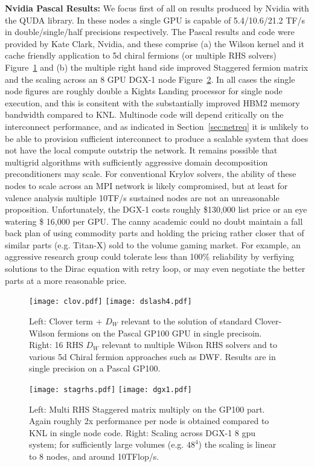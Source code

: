 \documentclass{PoS}
\begin{document}
{\bf Nvidia Pascal Results:}
We focus first of all on results produced by Nvidia with the QUDA library.
In these nodes a single GPU is capable of 5.4/10.6/21.2 TF/s in double/single/half
precisions respectively.
The Pascal results and code were provided by Kate Clark, Nvidia, and these
comprise (a) the Wilson kernel and it cache friendly application to 5d chiral
fermions (or multiple RHS solvers) Figure~\ref{fig:nvidia1} and (b) the 
multiple right hand side improved Staggered fermion matrix and the scaling across
an 8 GPU DGX-1 node Figure~\ref{fig:nvidia2}. 
In all cases the single node figures are roughly double a Kights Landing processor for single node execution,
and this is consitent with the substantially improved HBM2 memory bandwidth compared to KNL. 
Multinode code will depend critically on the interconnect performance, and as indicated in Section~\ref{sec:netreq}
it is unlikely to be able to provision sufficient interconnect to produce a scalable system that does not
have the local compute outstrip the network. It remains possible that multigrid algorithms with sufficiently
aggressive domain decomposition preconditioners may scale.
For conventional Krylov solvers, 
the ability of these nodes to scale across an MPI network is likely compromised, but at least for valence analysis
multiple 10TF/s sustained nodes are not an unreasonable proposition. 
%
Unfortunately, the DGX-1 costs roughly \$130,000 list price\cite{next}
or an eye watering \$ 16,000 per GPU. The canny academic could no doubt maintain a fall
back plan of using commodity parts and holding the pricing rather closer that of similar parts (e.g. Titan-X)
sold to the volume gaming market. For example,
an aggressive research group could tolerate less than 100\% reliability by verfiying solutions
to the Dirac equation with retry loop, or may even negotiate the better parts at a more reasonable price.

\begin{figure}[hbt]
\texttt{[image: clov.pdf]}
\texttt{[image: dslash4.pdf]}
\caption{\label{fig:nvidia1}
Left: Clover term + $D_W$ relevant to the solution of standard Clover-Wilson fermions on the Pascal GP100
GPU in single precisoin.
Right: 16 RHS $D_W$ relevant to multiple Wilson RHS solvers and to various 5d Chiral fermion approaches
such as DWF. Results are in single precision on a Pascal GP100. 
}
\end{figure}
\begin{figure}[hbt]
\texttt{[image: stagrhs.pdf]}
\texttt{[image: dgx1.pdf]}
\caption{\label{fig:nvidia2}
Left: Multi RHS Staggered matrix multiply on the GP100 part. Again roughly 2x performance per node is
obtained compared to KNL in single node code.
Right: Scaling across DGX-1 8 gpu system; for sufficiently large volumes (e.g. $48^4$) the scaling is linear
to 8 nodes, and around 10TFlop/s.
}
\end{figure}
\end{document}
